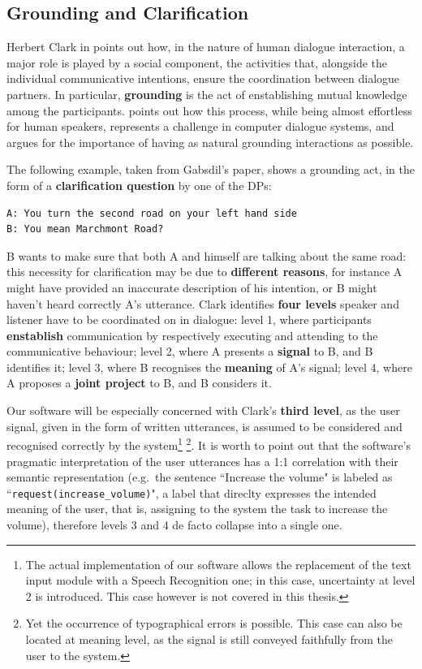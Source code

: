 \subsection{Grounding and Clarification}\label{ch:rw:ds:grounding}
Herbert Clark in \cite{clark_1996} points out how, in the nature of human dialogue interaction, a major role is played by a social component, the activities that, alongside the individual communicative intentions, ensure the coordination between dialogue partners. In particular, \textbf{grounding} is the act of enstablishing mutual knowledge among the participants. \cite{Gabsdil03clarificationin} points out how this process, while being almost effortless for human speakers, represents a challenge in computer dialogue systems, and argues for the importance of having as natural grounding interactions as possible.

The following example, taken from Gabsdil's paper, shows a grounding act, in the form of a \textbf{clarification question} by one of the DPs:
\begin{verbatim}
A: You turn the second road on your left hand side
B: You mean Marchmont Road?
\end{verbatim}
B wants to make sure that both A and himself are talking about the same road: this necessity for clarification may be due to \textbf{different reasons}, for instance A might have provided an inaccurate description of his intention, or B might haven't heard correctly A's utterance. Clark identifies \textbf{four levels} speaker and listener have to be coordinated on in dialogue: level 1, where participants \textbf{enstablish} communication by respectively executing and attending to the communicative behaviour; level 2, where A presents a \textbf{signal} to B, and B identifies it; level 3, where B recognises the \textbf{meaning} of A's signal; level 4, where A proposes a \textbf{joint project} to B, and B considers it.

Our software will be especially concerned with Clark's \textbf{third level}, as the user signal, given in the form of written utterances, is assumed to be considered and recognised correctly by the system\footnote{The actual implementation of our software allows the replacement of the text input module with a Speech Recognition one; in this case, uncertainty at level 2 is introduced. This case however is not covered in this thesis.} \footnote{Yet the occurrence of typographical errors is possible. This case can also be located at meaning level, as the signal is still conveyed faithfully from the user to the system.}. It is worth to point out that the software's pragmatic interpretation of the user utterances has a 1:1 correlation with their semantic representation (e.g.\ the sentence ``Increase the volume" is labeled as ``\texttt{request(increase\_volume)}", a label that direclty expresses the intended meaning of the user, that is, assigning to the system the task to increase the volume), therefore levels 3 and 4 de facto collapse into a single one.

